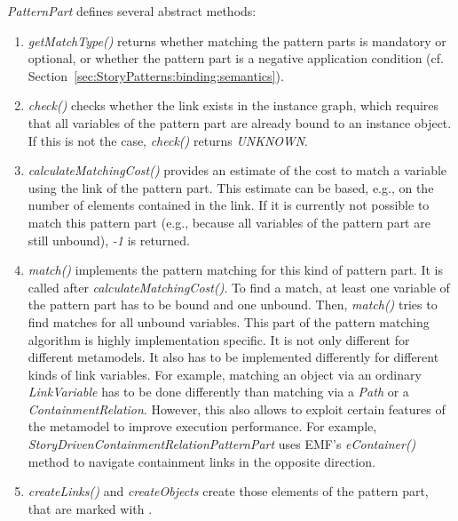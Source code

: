 \emph{PatternPart} defines several abstract methods:

\begin{enumerate}
	\item \emph{getMatchType()} returns whether matching the pattern parts is mandatory or optional, or whether the pattern part is a negative application condition (cf. Section~\ref{sec:StoryPatterns:binding:semantics}). 
	
	\item \emph{check()} checks whether the link exists in the instance graph, which requires that all variables of the pattern part are already bound to an instance object. 
	If this is not the case, \emph{check()} returns \emph{UNKNOWN}. 

	\item \emph{calculateMatchingCost()} provides an estimate of the cost to match a variable using the link of the pattern part. 
	This estimate can be based, e.g., on the number of elements contained in the link.
	If it is currently not possible to match this pattern part (e.g., because all variables of the pattern part are still unbound), \emph{-1} is returned.

	\item \emph{match()} implements the pattern matching for this kind of pattern part. 
	It is called after \emph{calculateMatchingCost()}. 
	To find a match, at least one variable of the pattern part has to be bound and one unbound. 
	Then, \emph{match()} tries to find matches for all unbound variables. 
	This part of the pattern matching algorithm is highly implementation specific. 
	It is not only different for different metamodels. 
	It also has to be implemented differently for different kinds of link variables.
	For example, matching an object via an ordinary \emph{LinkVariable} has to be done differently than matching via a \emph{Path} or a \emph{ContainmentRelation}.
	However, this also allows to exploit certain features of the metamodel to improve execution performance. 
	For example, \emph{StoryDrivenContainmentRelationPatternPart} uses EMF's \emph{eContainer()} method to navigate containment links in the opposite direction.	
	
	\item \emph{createLinks()} and \emph{createObjects} create those elements of the pattern part, that are marked with \create.
	

\end{enumerate}
